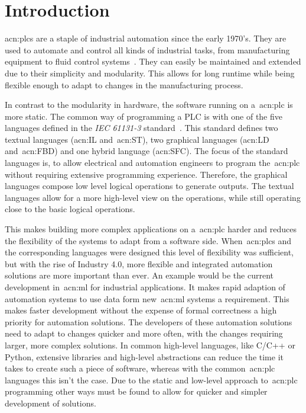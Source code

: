 
\section{Introduction}
\label{sec:Introduction}

\glspl{acn:plc} are a staple of industrial automation since the early 1970's.
They are used to automate and control all kinds of industrial tasks, from manufacturing equipment to fluid control systems~\cite{Erickson:1996aa}.
They can easily be maintained and extended due to their simplicity and modularity.
This allows for long runtime while being flexible enough to adapt to changes in the manufacturing process.

In contrast to the modularity in hardware, the software running on a~\gls{acn:plc} is more static.
The common way of programming a PLC is with one of the five languages defined in the \textit{IEC 61131-3} standard~\cite{Plcopen:61131-3}.
This standard defines two textual languages (\gls{acn:IL} and~\gls{acn:ST}), two graphical languages (\gls{acn:LD} and~\gls{acn:FBD}) and one hybrid language (\gls{acn:SFC}).
The focus of the standard languages is, to allow electrical and automation engineers to program the~\gls{acn:plc} without requiring extensive programming experience.
Therefore, the graphical languages compose low level logical operations to generate outputs.
The textual languages allow for a more high-level view on the operations, while still operating close to the basic logical operations.

This makes building more complex applications on a~\gls{acn:plc} harder and reduces the flexibility of the systems to adapt from a software side.
When~\glspl{acn:plc} and the corresponding languages were designed this level of flexibility was sufficient, but with the rise of Industry 4.0, more flexible and integrated automation solutions are more important than ever.
An example would be the current development in~\gls{acn:ml} for industrial applications.
It makes rapid adaption of automation systems to use data form new~\acrshort{acn:ml} systems a requirement.
This makes faster development without the expense of formal correctness a high priority for automation solutions.
The developers of these automation solutions need to adapt to changes quicker and more often, with the changes requiring larger, more complex solutions.
In common high-level languages, like C/C++ or Python, extensive libraries and high-level abstractions can reduce the time it takes to create such a piece of software, whereas with the common~\gls{acn:plc} languages this isn't the case.
Due to the static and low-level approach to~\gls{acn:plc} programming other ways must be found to allow for quicker and simpler development of solutions.
